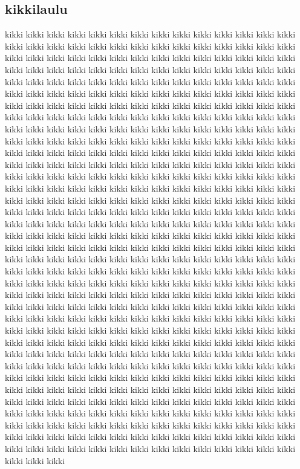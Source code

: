 \documentclass[a4paper,12pt,oneside]{lauluvihko}
\begin{document}
\begin{multicols}{2}


\section{kikkilaulu}
kikki kikki kikki kikki kikki kikki kikki kikki kikki kikki kikki kikki kikki kikki kikki kikki kikki kikki kikki kikki kikki kikki kikki kikki kikki kikki kikki kikki kikki kikki kikki kikki kikki kikki kikki kikki kikki kikki kikki kikki kikki kikki kikki kikki kikki kikki kikki kikki kikki kikki kikki kikki kikki kikki kikki kikki kikki kikki kikki kikki kikki kikki kikki kikki kikki kikki kikki kikki kikki kikki kikki kikki kikki kikki kikki kikki kikki kikki kikki kikki kikki kikki kikki kikki kikki kikki kikki kikki kikki kikki kikki kikki kikki kikki kikki kikki kikki kikki kikki kikki kikki kikki kikki kikki kikki kikki kikki kikki kikki kikki kikki kikki kikki kikki kikki kikki kikki kikki kikki kikki kikki kikki kikki kikki kikki kikki kikki kikki kikki kikki kikki kikki kikki kikki kikki kikki kikki kikki kikki kikki kikki kikki kikki kikki kikki kikki kikki kikki kikki kikki kikki kikki kikki kikki kikki kikki kikki kikki kikki kikki kikki kikki kikki kikki kikki kikki kikki kikki kikki kikki kikki kikki kikki kikki kikki kikki kikki kikki kikki kikki kikki kikki kikki kikki kikki kikki kikki kikki kikki kikki kikki kikki kikki kikki kikki kikki kikki kikki kikki kikki kikki kikki kikki kikki kikki kikki kikki kikki kikki kikki kikki kikki kikki kikki kikki kikki kikki kikki kikki kikki kikki kikki kikki kikki kikki kikki kikki kikki kikki kikki kikki kikki kikki kikki kikki kikki kikki kikki kikki kikki kikki kikki kikki kikki kikki kikki kikki kikki kikki kikki kikki kikki kikki kikki kikki kikki kikki kikki kikki kikki kikki kikki kikki kikki kikki kikki kikki kikki kikki kikki kikki kikki kikki kikki kikki kikki kikki kikki kikki kikki kikki kikki kikki kikki kikki kikki kikki kikki kikki kikki kikki kikki kikki kikki kikki kikki kikki kikki kikki kikki kikki kikki kikki kikki kikki kikki kikki kikki kikki kikki kikki kikki kikki kikki kikki kikki kikki kikki kikki kikki kikki kikki kikki kikki kikki kikki kikki kikki kikki kikki kikki kikki kikki kikki kikki kikki kikki kikki kikki kikki kikki kikki kikki kikki kikki kikki kikki kikki kikki kikki kikki kikki kikki kikki kikki kikki kikki kikki kikki kikki kikki kikki kikki kikki kikki kikki kikki kikki kikki kikki kikki kikki kikki kikki kikki kikki kikki kikki kikki kikki kikki kikki kikki kikki kikki kikki kikki kikki kikki kikki kikki kikki kikki kikki kikki kikki kikki kikki kikki kikki kikki kikki kikki kikki kikki kikki kikki kikki kikki kikki kikki kikki kikki kikki kikki kikki kikki kikki kikki kikki kikki kikki kikki kikki kikki kikki kikki kikki kikki kikki kikki kikki kikki kikki kikki kikki kikki kikki kikki kikki kikki kikki kikki kikki kikki kikki kikki kikki kikki kikki kikki kikki kikki kikki kikki kikki kikki kikki kikki kikki kikki kikki kikki kikki kikki kikki kikki kikki kikki kikki kikki kikki kikki kikki kikki kikki kikki kikki kikki kikki kikki kikki kikki kikki kikki kikki kikki kikki kikki kikki kikki kikki kikki kikki kikki kikki kikki kikki kikki kikki kikki kikki kikki kikki kikki kikki kikki 
\end{multicols}
\end{document}
